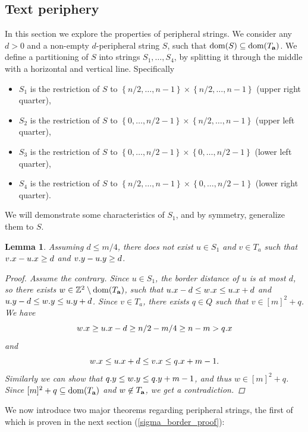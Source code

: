 \documentclass[11pt]{article}
\newcommand{\Z}{\mathbb{Z}}
\newcommand{\set}[1]{\left\lbrace #1 \right\rbrace}
\theoremstyle{plain}
\newtheorem{lemma}{Lemma}
\theoremstyle{definition}
\theoremstyle{remark}
\begin{document}
\subsection{Text periphery}\label{periphery_section}
In this section we explore the properties of peripheral strings.
We consider any $d > 0$ and a non-empty $d$-peripheral string $S$, such that $\operatorname*{dom}(S) \subseteq \operatorname*{dom}(T_\mathbf{a})$.
We define a partitioning of $S$ into strings $S_1, \dots, S_4$, by splitting it through the middle with a horizontal and vertical line. 
Specifically
\begin{itemize}
	\item $S_1$ is the restriction of $S$ to $\set{n / 2, \dots, n - 1} \times \set{n / 2, \dots, n - 1}$ (upper right quarter),
	\item $S_2$ is the restriction of $S$ to $\set{0, \dots, n / 2 - 1} \times \set{n / 2, \dots, n - 1}$ (upper left quarter),
	\item $S_3$ is the restriction of $S$ to $\set{0, \dots, n / 2 - 1} \times \set{0, \dots, n / 2 - 1}$ (lower left quarter),
	\item $S_4$ is the restriction of $S$ to $\set{n / 2, \dots, n - 1} \times \set{0, \dots, n / 2 - 1}$ (lower right quarter).
\end{itemize}
We will demonstrate some characteristics of $S_1$, and by symmetry, generalize them to $S$.

\begin{lemma} \label{border_lemma}
	Assuming $d \le m/4$, there does not exist $u \in S_1$ and $v \in T_a$ such that $v.x - u.x \ge d$ and $v.y - u.y \ge d$.
	\begin{proof}
		Assume the contrary.
		Since $u \in S_1$, the border distance of $u$ is at most $d$, so there exists $w \in \Z^2 \setminus \d{\Ta}$, such that
		$u.x - d \le w.x \le u.x + d$ and
		$u.y - d \le w.y \le u.y + d$.
		Since $v \in T_a$, there exists $q \in Q$ such that $v \in [m]^2 + q$.
		We have
		\[ w.x \ge u.x - d \ge n / 2 - m / 4 \ge n - m > q.x \]
		and
		\[ w.x \le u.x + d \le v.x \le q.x + m - 1. \]
		Similarly we can show that $q.y \le w.y \le q.y + m - 1$, and thus $w \in [m]^2 + q$.
		Since $[m]^2 + q \subseteq \operatorname*{dom}(T_\mathbf{a})$ and $w \not \in T_\mathbf{a}$, we get a contradiction.
	\end{proof}
\end{lemma}

We now introduce two major theorems regarding peripheral strings, the first of which is proven in the next section (\ref{sigma_border_proof}):
\end{document}
